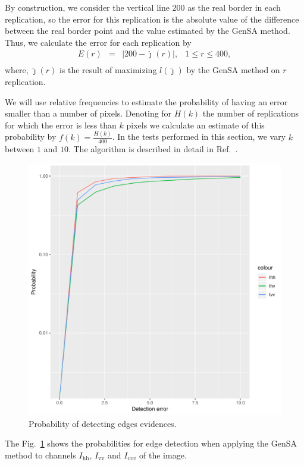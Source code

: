 \documentclass[conference]{IEEEtran}
\begin{document}
     By construction, we consider the vertical line $200$ as the real border in each replication, so the error for this replication is the absolute value of the difference between the real border point and the value estimated by the GenSA method. Thus, we calculate the error for each replication by
\begin{equation*}
\begin{array}{llll}
	E(r) &=& |200 - \hat{\jmath}(r)|, & 1\leq r \leq 400,  \\
\end{array}
\end{equation*}
where, $\hat{\jmath}(r)$ is the result of maximizing $l(\widehat\jmath)$ by the GenSA method on $r$ replication.

We will use relative frequencies to estimate the probability of having an error smaller than a number of pixels. Denoting for $H(k)$ the number of replications for which the error is less than $k$ pixels we calculate an estimate of this probability by $f(k)=\frac{H(k)}{400}$. In the tests performed in this section, we vary $k$ between $1$ and $10$. The algorithm is described in detail in Ref.~\cite{fbgm}.  
   \begin{figure}[hbt]
\centering
	\includegraphics[scale=0.4]{metricas_ihh_ivh_ivv_nhfc_artigos.pdf}%
	\caption{Probability of detecting edges evidences.}
\label{probability_edge_detc}
\end{figure}
The Fig.~\ref{probability_edge_detc} shows the probabilities for edge detection when applying the GenSA method to channels $I_\text{hh}$, $I_\text{vv}$ and $I_{vvv}$ of the image. 
\end{document}
